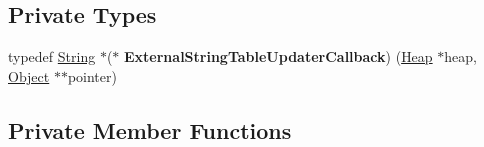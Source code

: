 \subsection*{Private Types}
\begin{DoxyCompactItemize}
\item 
typedef \hyperlink{classv8_1_1internal_1_1_string}{String} $\ast$($\ast$ {\bfseries External\+String\+Table\+Updater\+Callback}) (\hyperlink{classv8_1_1internal_1_1_heap}{Heap} $\ast$heap, \hyperlink{classv8_1_1internal_1_1_object}{Object} $\ast$$\ast$pointer)\hypertarget{classv8_1_1internal_1_1_heap_ac58e878b331572a6259644729226b016}{}\label{classv8_1_1internal_1_1_heap_ac58e878b331572a6259644729226b016}

\end{DoxyCompactItemize}
\subsection*{Private Member Functions}
